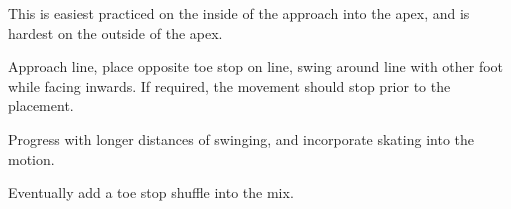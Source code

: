 
This is easiest practiced on the inside of the approach into the apex, and is hardest on the outside of the apex.

Approach line, place opposite toe stop on line, swing around line with other foot while facing inwards. 
If required, the movement should stop prior to the placement.    


Progress with longer distances of swinging, and incorporate skating into the motion. 


Eventually add a toe stop shuffle into the mix.
